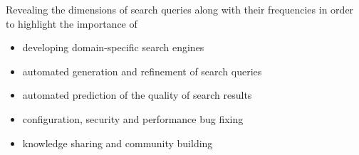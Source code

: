 Revealing the dimensions of search queries along with their frequencies in order to highlight the importance of

\begin{itemize}
    \item developing domain-specific search engines
    \item automated generation and refinement of search queries
    \item automated prediction of the quality of search results
    \item configuration, security and performance bug fixing
    \item knowledge sharing and community building
\end{itemize}

